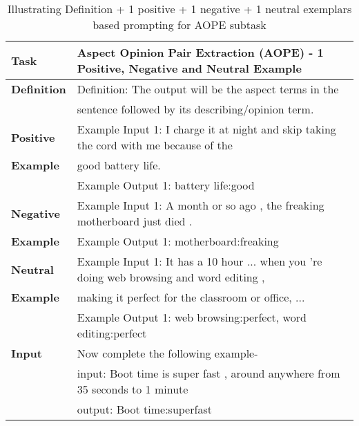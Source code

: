 \documentclass[11pt]{article}
\begin{document}
\begin{table*}[]
\resizebox{\linewidth}{!}
{
\begin{tabular}{ll}
\hline
\textbf{Task} & Aspect Opinion Pair Extraction (AOPE) - 1 Positive, Negative and Neutral Example \\ 
\hline                                                  
\textbf{Definition} & Definition: The output will be the aspect terms in the \\
& sentence followed by its describing/opinion term.\\ 
\hline                                          
\textbf{Positive}   & Example Input 1: I charge it at night and skip taking the cord with me because of the \\ 
\textbf{Example}    &  good battery life.       \\
\textbf{}           & Example Output 1: battery life:good   \\
\hline                             
\textbf{Negative}   & Example Input 1: A month or so ago , the freaking motherboard just died . \\
\textbf{Example}    & Example Output 1: motherboard:freaking \\
\hline  
\textbf{Neutral}    & Example Input 1: It has a 10 hour ... when you 're doing web browsing and word editing , \\
\textbf{Example}    & making it perfect for the classroom or office, ...          \\
\textbf{}           & Example Output 1: web browsing:perfect, word editing:perfect          \\                 
\hline 
\textbf{Input}      & Now complete the following example-                                \\
\textbf{}           & input: Boot time is super fast , around anywhere from 35 seconds to 1 minute \\
                    & output: Boot time:superfast\\ \hline
\end{tabular}
}
\caption{
     Illustrating Definition + 1 positive + 1 negative + 1 neutral exemplars based prompting for AOPE subtask}
\label{tab:absa5_aope}
\end{table*} 
\end{document}

